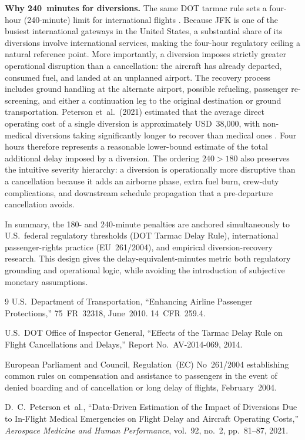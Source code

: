 \documentclass[11pt]{article}
\begin{document}
\textbf{Why 240~minutes for diversions.}
The same DOT tarmac rule sets a four-hour (240-minute) limit for international flights \cite{dot2010tarmac}. Because JFK is one of the busiest international gateways in the United States, a substantial share of its diversions involve international services, making the four-hour regulatory ceiling a natural reference point. More importantly, a diversion imposes strictly greater operational disruption than a cancellation: the aircraft has already departed, consumed fuel, and landed at an unplanned airport. The recovery process includes ground handling at the alternate airport, possible refueling, passenger re-screening, and either a continuation leg to the original destination or ground transportation. Peterson et~al.\ (2021) estimated that the average direct operating cost of a single diversion is approximately USD~38,000, with non-medical diversions taking significantly longer to recover than medical ones \cite{peterson2021diversion}. Four hours therefore represents a reasonable lower-bound estimate of the total additional delay imposed by a diversion. The ordering $240 > 180$ also preserves the intuitive severity hierarchy: a diversion is operationally more disruptive than a cancellation because it adds an airborne phase, extra fuel burn, crew-duty complications, and downstream schedule propagation that a pre-departure cancellation avoids.

In summary, the 180- and 240-minute penalties are anchored simultaneously to U.S.\ federal regulatory thresholds (DOT Tarmac Delay Rule), international passenger-rights practice (EU~261/2004), and empirical diversion-recovery research. This design gives the delay-equivalent-minutes metric both regulatory grounding and operational logic, while avoiding the introduction of subjective monetary assumptions.

\begin{thebibliography}{9}
U.S.\ Department of Transportation, ``Enhancing Airline Passenger Protections,'' 75~FR~32318, June~2010. 14~CFR~259.4.

U.S.\ DOT Office of Inspector General, ``Effects of the Tarmac Delay Rule on Flight Cancellations and Delays,'' Report No.\ AV-2014-069, 2014.

European Parliament and Council, Regulation~(EC) No~261/2004 establishing common rules on compensation and assistance to passengers in the event of denied boarding and of cancellation or long delay of flights, February~2004.

D.~C.~Peterson et~al., ``Data-Driven Estimation of the Impact of Diversions Due to In-Flight Medical Emergencies on Flight Delay and Aircraft Operating Costs,'' \emph{Aerospace Medicine and Human Performance}, vol.~92, no.~2, pp.~81--87, 2021.
\end{thebibliography}
\end{document}
